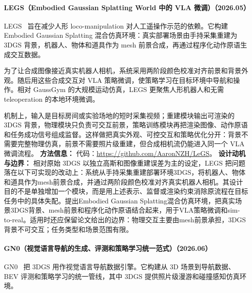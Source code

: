 \paragraph{LEGS（Embodied Gaussian Splatting World 中的 VLA 微调）（2026.05）}
LEGS~\cite{2606_01458} 旨在减少人形 loco-manipulation 对人工遥操作示范的依赖。它构建 Embodied Gaussian Splatting 混合仿真环境：真实部署场景由手持采集重建为 3DGS 背景，机器人、物体和道具作为 mesh 前景合成，再通过程序化动作原语生成交互数据。

为了让合成图像接近真实机器人相机，系统采用两阶段颜色校准对齐前景和背景外观。随后用这些合成交互对 VLA 策略微调，使策略学习在目标环境中导航和操作。相对 GaussGym 的大规模运动仿真，LEGS 更聚焦人形机器人和无需 teleoperation 的本地环境微调。

机制上，输入是目标房间或实验场地的短时采集视频；重建模块输出可渲染的 3DGS 背景，物理模块只负责可交互前景，策略训练模块再把渲染图像、动作原语和任务成功信号组成监督。这样做把真实外观、可控交互和策略优化分开：背景不需要完整物理仿真，前景不需要照片级重建，但合成相机流仍能进入同一个 VLA 微调流程。
\textbf{方法信息：} 代码：\url{https://github.com/AaronNZH/LeGS}。
\textbf{设计动机与边界：} 相对原始 3DGS 以独立高斯和图像重建误差为主的设定，LEGS 把问题落在以下可实现的改动上：系统从手持采集重建部署环境3DGS，将机器人、物体和道具作为mesh前景合成，并通过两阶段颜色校准对齐真实机器人相机。其设计目的不是单独增加一个模块，而是用上述表示、监督或渲染约束消除原流程在目标任务中的具体失配。提出Embodied Gaussian Splatting混合仿真环境，把真实场景3DGS背景、mesh前景和程序化动作原语结合起来，用于VLA策略微调和sim-to-real。适用时还应保留论文给出的边界：物理交互主要由mesh前景承担，3DGS背景不可交互；任务类型和场景范围有限。
\paragraph{GN0（视觉语言导航的生成、评测和策略学习统一范式）（2026.06）}
GN0~\cite{2606_03682} 把 3DGS 用作视觉语言导航数据引擎。它构建从 3D 场景到导航数据、BEV 评测和策略学习的统一管线，其中 3DGS 提供照片级漫游和碰撞感知仿真环境。

